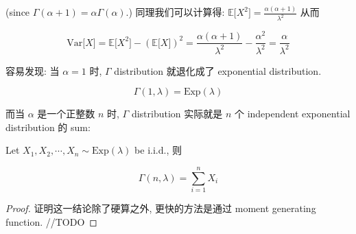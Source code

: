 (since \(\Gamma(\mathit{\alpha} + 1) = \mathit{\alpha}\Gamma(\mathit{\alpha})\).) 同理我们可以计算得: \(\mathbb{E}\lbrack\mathit{X}^{2}\rbrack = \frac{\mathit{\alpha}(\mathit{\alpha} + 1)}{\mathit{\lambda}^{2}}\) 从而

\[\text{Var}\lbrack\mathit{X}\rbrack = \mathbb{E}\lbrack\mathit{X}^{2}\rbrack - (\mathbb{E}\lbrack\mathit{X}\rbrack)^{2} = \frac{\mathit{\alpha}(\mathit{\alpha} + 1)}{\mathit{\lambda}^{2}} - \frac{\mathit{\alpha}^{2}}{\mathit{\lambda}^{2}} = \frac{\mathit{\alpha}}{\mathit{\lambda}^{2}}\]

容易发现: 当 \(\mathit{\alpha} = 1\) 时, \(\Gamma\) distribution 就退化成了 exponential distribution.

\[\Gamma(1,\mathit{\lambda}) = \text{Exp}(\mathit{\lambda})\]

而当 \(\mathit{\alpha}\) 是一个正整数 \(\mathit{n}\) 时, \(\Gamma\) distribution 实际就是 \(\mathit{n}\) 个 independent exponential distribution 的 sum:

\begin{proposition}{}

Let \(\mathit{X}_{1},\mathit{X}_{2},\cdots,\mathit{X}_{\mathit{n}} \sim \text{Exp}(\mathit{\lambda})\) be i.i.d., 则

\[\Gamma(\mathit{n},\mathit{\lambda}) = \sum\limits_{\mathit{i} = 1}^{\mathit{n}}\mathit{X}_{\mathit{i}}\]

\end{proposition}

\begin{proof}

证明这一结论除了硬算之外, 更快的方法是通过 moment generating function. //TODO

\end{proof}

